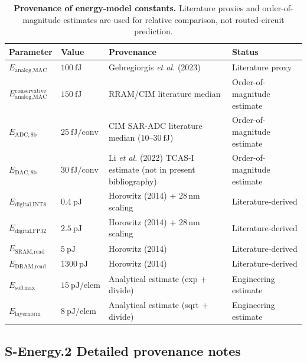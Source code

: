 \begin{table}[ht]
\centering
\small
\begin{tabular}{@{}>{\raggedright\arraybackslash}p{}>{\raggedright\arraybackslash}p{}>{\raggedright\arraybackslash}p{}>{\raggedright\arraybackslash}p{}@{}}
\toprule
\textbf{Parameter} & \textbf{Value} & \textbf{Provenance} & \textbf{Status} \\
\midrule
$E_{\text{analog,MAC}}$ & $100~\text{fJ}$ & Gebregiorgis \textit{et al.} (2023) \cite{gebregiorgis2023organiccim} & Literature proxy \\
$E_{\text{analog,MAC}}^{\text{conservative}}$ & $150~\text{fJ}$ & RRAM/CIM literature median & Order-of-magnitude estimate \\
$E_{\text{ADC},8\text{b}}$ & $25~\text{fJ/conv}$ & CIM SAR-ADC literature median ($10$--$30~\text{fJ}$) & Order-of-magnitude estimate \\
$E_{\text{DAC},8\text{b}}$ & $30~\text{fJ/conv}$ & Li \textit{et al.} (2022) TCAS-I estimate (not in present bibliography) & Order-of-magnitude estimate \\
$E_{\text{digital,INT8}}$ & $0.4~\text{pJ}$ & Horowitz (2014) \cite{horowitz2014computing} + 28\,nm scaling & Literature-derived \\
$E_{\text{digital,FP32}}$ & $2.5~\text{pJ}$ & Horowitz (2014) \cite{horowitz2014computing} + 28\,nm scaling & Literature-derived \\
$E_{\text{SRAM,read}}$ & $5~\text{pJ}$ & Horowitz (2014) \cite{horowitz2014computing} & Literature-derived \\
$E_{\text{DRAM,read}}$ & $1300~\text{pJ}$ & Horowitz (2014) \cite{horowitz2014computing} & Literature-derived \\
$E_{\text{softmax}}$ & $15~\text{pJ/elem}$ & Analytical estimate (exp + divide) & Engineering estimate \\
$E_{\text{layernorm}}$ & $8~\text{pJ/elem}$ & Analytical estimate (sqrt + divide) & Engineering estimate \\
\bottomrule
\end{tabular}
\caption{\textbf{Provenance of energy-model constants.} Literature proxies and order-of-magnitude estimates are used for relative comparison, not routed-circuit prediction.}
\label{tab:energy-provenance}
\end{table}

\subsection*{S-Energy.2 Detailed provenance notes}


